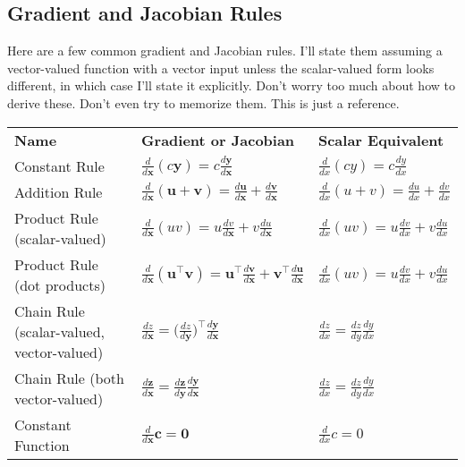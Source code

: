 \documentclass[
  letterpaper,
  DIV=11,
  numbers=noendperiod]{scrreprt}
\begin{document}
\hypertarget{gradient-and-jacobian-rules}{%
\subsection{Gradient and Jacobian
Rules}\label{gradient-and-jacobian-rules}}

Here are a few common gradient and Jacobian rules. I'll state them
assuming a vector-valued function with a vector input unless the
scalar-valued form looks different, in which case I'll state it
explicitly. Don't worry too much about how to derive these. Don't even
try to memorize them. This is just a reference.

\begin{longtable}[]{@{}
  >{\raggedright\arraybackslash}p{}
  >{\raggedright\arraybackslash}p{}
  >{\raggedright\arraybackslash}p{}@{}}
\toprule()
\endhead
\textbf{Name} & \textbf{Gradient or Jacobian} & \textbf{Scalar
Equivalent} \\
Constant Rule &
\(\frac{d}{d\mathbf{x}} (c\mathbf{y}) = c\frac{d\mathbf{y}}{d\mathbf{x}}\)
& \(\frac{d}{dx} (cy) = c\frac{dy}{dx}\) \\
Addition Rule &
\(\frac{d}{d\mathbf{x}}(\mathbf{u} + \mathbf{v}) = \frac{d\mathbf{u}}{d\mathbf{x}} + \frac{d\mathbf{v}}{d\mathbf{x}}\)
& \(\frac{d}{dx}(u + v) = \frac{du}{dx} + \frac{dv}{dx}\) \\
Product Rule (scalar-valued) &
\(\frac{d}{d\mathbf{x}}(uv) = u\frac{dv}{d\mathbf{x}} + v\frac{du}{d\mathbf{x}}\)
& \(\frac{d}{dx}(uv) = u\frac{dv}{dx} + v\frac{du}{dx}\) \\
Product Rule (dot products) &
\(\frac{d}{d\mathbf{x}}(\mathbf{u}^\top \mathbf{v}) = \mathbf{u}^\top \frac{d\mathbf{v}}{d\mathbf{x}} + \mathbf{v}^\top \frac{d\mathbf{u}}{d\mathbf{x}}\)
& \(\frac{d}{dx}(uv) = u\frac{dv}{dx} + v\frac{du}{dx}\) \\
Chain Rule (scalar-valued, vector-valued) &
\(\frac{dz}{d\mathbf{x}} = \big(\frac{dz}{d\mathbf{y}}\big)^\top \frac{d\mathbf{y}}{d\mathbf{x}}\)
& \(\frac{dz}{dx} = \frac{dz}{dy} \frac{dy}{dx}\) \\
Chain Rule (both vector-valued) &
\(\frac{d\mathbf{z}}{d\mathbf{x}} = \frac{d\mathbf{z}}{d\mathbf{y}} \frac{d\mathbf{y}}{d\mathbf{x}}\)
& \(\frac{dz}{dx} = \frac{dz}{dy} \frac{dy}{dx}\) \\
Constant Function & \(\frac{d}{d\mathbf{x}} \mathbf{c} = \mathbf{0}\) &
\(\frac{d}{dx} c = 0\) \\

\end{longtable}
\end{document}
